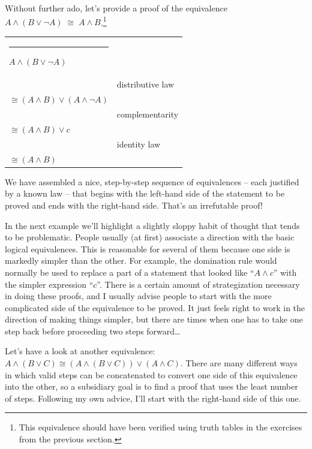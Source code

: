 Without further ado, let's provide a proof of the equivalence  
$A \land (B \lor {\lnot}A) \; \cong \; A \land B $.\footnote{This equivalence should have been verified using truth tables in the exercises from the previous
section.}
\medskip

\begin{center}
\begin{tabular}{p{2in}p{2in}}
\rule{10pt}{0pt} $A \land (B \lor {\lnot}A)$ & \\
 & distributive law\\
$\cong (A \land B) \lor (A \land {\lnot}A)$ & \\
 & complementarity\\
$\cong (A \land B) \lor c$ & \\
 & identity law\\
$\cong (A \land B)$ & \\
\end{tabular}
\end{center}
\medskip

We have assembled a nice, step-by-step sequence of equivalences -- each
justified by a known law -- that begins with the left-hand side of the 
statement to be proved and ends with the right-hand side.  That's an 
irrefutable proof!

In the next example we'll highlight a slightly sloppy habit of thought
that tends to be problematic.  People usually (at first) associate a 
direction with the basic logical equivalences.  This is reasonable 
for several of them because one side is markedly simpler than the 
other.  For example, the domination rule would normally be used
to replace a part of a statement that looked like ``$A \land c$'' with
the simpler expression ``$c$''.  There is a certain amount of strategization
necessary in doing these proofs, and I usually advise people to start 
with the more complicated side of the equivalence to be proved.  It just
feels right to work in the direction of making things simpler, but there 
are times when one has to take one step back before proceeding two steps
forward\ldots   

Let's have a look at another equivalence: $A \land (B \lor C) \cong 
(A \land (B \lor C)) \lor (A \land C)$.  There are many different ways
in which valid steps can be concatenated to convert one side of this 
equivalence into the other, so a subsidiary goal is to find a proof that
uses the least number of steps.  Following my own advice, I'll start 
with the right-hand side of this one.
\medskip

